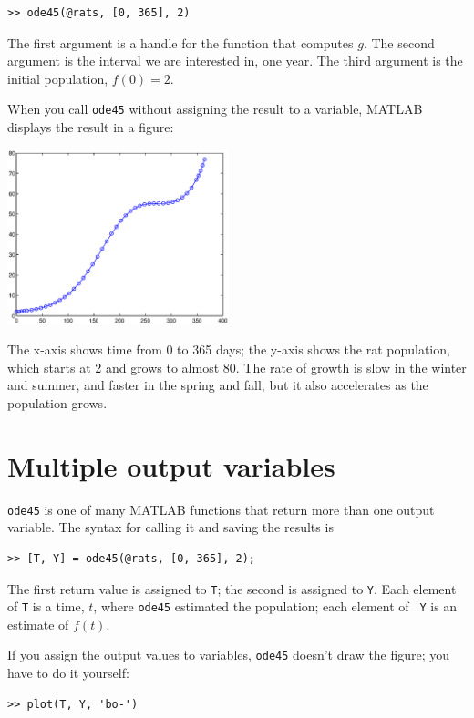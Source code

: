 \documentclass{book}
\begin{document}
\begin{verbatim}
>> ode45(@rats, [0, 365], 2)
\end{verbatim}

The first argument is a handle for the function that
computes $g$.  The second argument is the interval we are interested
in, one year.  The third argument is the initial population, $f(0) = 2$.

When you call {\tt ode45} without assigning the result to a variable,
MATLAB displays the result in a figure:

\beforefig \centerline{\includegraphics[height=2in]{figs/rats.eps}}

The x-axis shows time from 0 to 365 days; the y-axis shows the rat
population, which starts at 2 and grows to almost 80.  The rate
of growth is slow in the winter and summer, and faster in the
spring and fall, but it also accelerates as the population grows.


\section{Multiple output variables}
\label{rats}

{\tt ode45} is one of many MATLAB functions that return more
than one output variable.  The syntax for calling it and saving
the results is

\begin{verbatim}
>> [T, Y] = ode45(@rats, [0, 365], 2);
\end{verbatim}

The first return value is assigned to {\tt T}; the second is assigned
to {\tt Y}.  Each element of {\tt T} is a time,
$t$, where {\tt ode45} estimated the population; each element of {\tt
Y} is an estimate of $f(t)$.

If you assign the output values to variables,
{\tt ode45} doesn't draw the figure;
you have to do it yourself:

\begin{verbatim}
>> plot(T, Y, 'bo-')
\end{verbatim}
\end{document}
